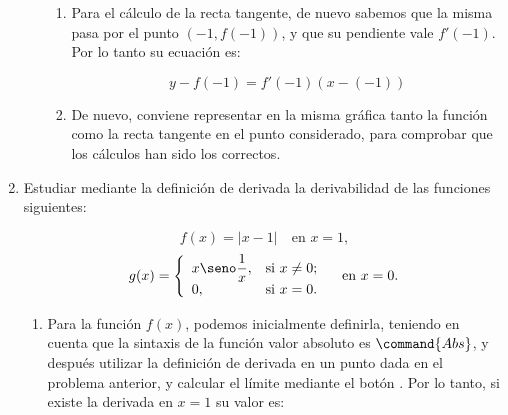 \begin{enumerate}[leftmargin=*]
\begin{enumerate}
\begin{indication}
{\begin{enumerate}
\[
f'(a) = \mathop {\lim }\limits_{h \to 0} \frac{{f(a + h) - f(a)}}
{h}
\]
en donde, por aligerar la notación, hemos llamado $h$ a lo que en la
teoría denominábamos $\Delta x$.

Por lo tanto, para calcular la derivada de la función $f$ en $a=-1$
mediante la definición, procedemos con:

\[
f'(-1) = \mathop {\lim }\limits_{h \to 0} \frac{{f(-1 + h) - f(-1)}}
{h}
\]

Para calcular el límite, podemos utilizar el botón  de la barra de botones.

\item Para el cálculo de la recta tangente, de nuevo sabemos que
la misma pasa por el punto $(-1, f(-1))$, y que su pendiente vale
$f'(-1)$. Por lo tanto su ecuación es:

\[
y - f( - 1) = f'(-1)\left( {x - ( - 1)} \right)
\]

\item De nuevo, conviene representar en la misma gráfica tanto la
función como la recta tangente en el punto considerado, para
comprobar que los cálculos han sido los correctos.

\end{enumerate}
}
\end{indication}


\end{enumerate}




\item Estudiar mediante la definición de derivada la derivabilidad
de las funciones siguientes:


\[
f(x)=|x-1| \quad \textrm{en $x=1$,}
\]
\[
g(x)=\left\{%
\begin{array}{ll}
   x \seno\dfrac{1}{x}, & \hbox{si $x\neq 0$;} \\
   0, & \hbox{si $x=0$.} \\
\end{array}%
\right. \quad \textrm{en $x=0$.}
\]

\begin{indication}
{
\begin{enumerate}
\item Para la función $f(x)$, podemos inicialmente definirla,
teniendo en cuenta que la sintaxis de la función valor absoluto es
$\command{Abs}$, y después utilizar la definición de derivada en un
punto dada en el problema anterior, y calcular el límite mediante el
botón . Por lo tanto, si existe la
derivada en $x=1$ su valor es:



\end{enumerate}}
\end{indication}
\end{enumerate}
